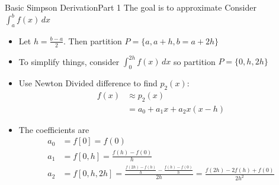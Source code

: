 \documentclass[10pt]{beamer}
\begin{document}
\begin{frame}[shrink]{Basic Simpson Derivation}{Part 1}
The goal is to approximate Consider $\int_{a}^{b} f(x)\,dx$\\[3mm]
  \begin{itemize}
  \item Let $h=\frac{b-a}{2}$. Then partition $P =\{a,a+h,b=a+2h\}$ 
  \item To simplify things, consider $\int_{0}^{2h} f(x)\,dx$ so partition $P =\{0,h,2h\}$\smallskip
  \item Use Newton Divided difference to find  $p_2(x)$:
    \begin{align*}
      f(x) & \approx p_2(x)\\
          &= a_0 + a_1 x + a_2 x(x-h)
    \end{align*}
    \item The coefficients are 
    \begin{align*}
        a_0 &= f[0] = f(0) \\ 
        a_1 &= f[0,h] = \frac{f(h) - f(0)}{h}\\
        a_2 &= f[0,h,2h] = \frac{\frac{f(2h)-f(h)}{h}-\frac{f(h)-f(0)}{h}}{2h} = \frac{f(2h)-2f(h)+f(0)}{2h^2}
    \end{align*}
\end{itemize}
\end{frame}
\end{document}

